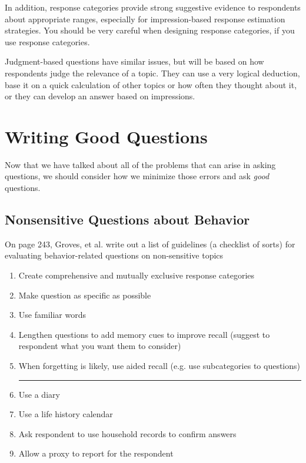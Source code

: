 \documentclass[11pt]{lecturenotes}
\begin{document}


In addition, response categories provide strong suggestive evidence to respondents about appropriate ranges, especially for impression-based response estimation strategies. You should be very careful when designing response categories, if you use response categories. 

Judgment-based questions have similar issues, but will be based on how respondents judge the relevance of a topic. They can use a very logical deduction, base it on a quick calculation of other topics or how often they thought about it, or they can develop an answer based on impressions. 


\section{Writing Good Questions}
Now that we have talked about all of the problems that can arise in asking questions, we should consider how we minimize those errors and ask \emph{good} questions.

\subsection[15]{Nonsensitive Questions about Behavior}
On page 243, Groves, et al. write out a list of guidelines (a checklist of sorts) for evaluating behavior-related questions on non-sensitive topics

\begin{enumerate}[noitemsep]
\item Create comprehensive and mutually exclusive response categories
\item Make question as specific as possible
\item Use familiar words
\item Lengthen questions to add memory cues to improve recall (suggest to respondent what you want them to consider)
\item When forgetting is likely, use aided recall (e.g. use subcategories to questions)\hrule\vspace{.3em}
\item Use a diary
\item Use a life history calendar
\item Ask respondent to use household records to confirm answers
\item Allow a proxy to report for the respondent
\end{enumerate}
\end{document}
